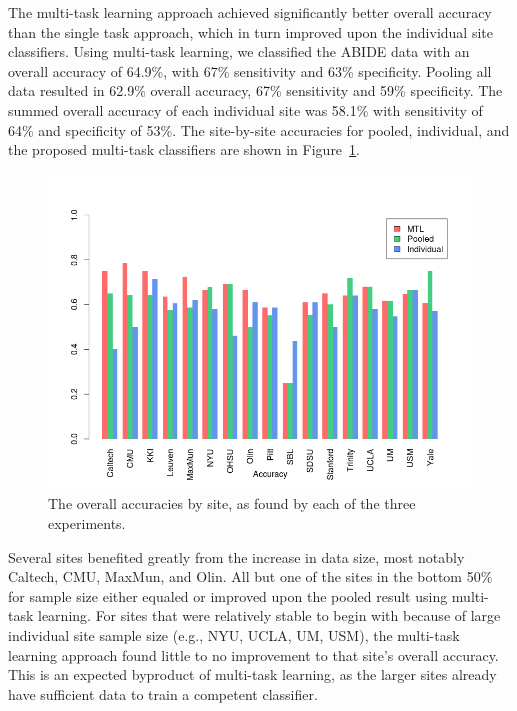 \documentclass{llncs}
\begin{document}
The multi-task learning approach achieved significantly better overall accuracy
than the single task approach, which in turn improved upon the individual site
classifiers. Using multi-task learning, we classified the ABIDE data with an
overall accuracy of 64.9\%, with 67\% sensitivity and 63\% specificity.  Pooling
all data resulted in 62.9\% overall accuracy, 67\% sensitivity and 59\%
specificity. The summed overall accuracy of each individual site was 58.1\% with
sensitivity of 64\% and specificity of 53\%. The site-by-site accuracies for
pooled, individual, and the proposed multi-task classifiers are shown in
Figure~\ref{fig:acc_bar}.
\begin{figure}
	\centering
	\includegraphics[scale = .4]{acc_bar.png}
	\caption{The overall accuracies by site, as found by each of the three experiments. }
	\label{fig:acc_bar}
	\par\vspace{0pt}
\end{figure}


Several sites benefited greatly from the increase in data size, most notably
Caltech, CMU, MaxMun, and Olin.  All but one of the sites in the bottom 50\% for
sample size either equaled or improved upon the pooled result using multi-task learning.  For
sites that were relatively stable to begin with because of large individual site
sample size (e.g., NYU, UCLA, UM, USM), the multi-task learning approach found little to no
improvement to that site's overall accuracy. This is an expected byproduct of
multi-task learning, as the larger sites already have sufficient data to train
a competent classifier.
\end{document}
